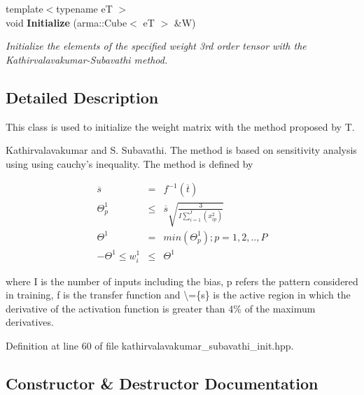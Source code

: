 \begin{DoxyCompactItemize}
{\footnotesize template$<$typename eT $>$ }\\void \textbf{ Initialize} (arma\+::\+Cube$<$ eT $>$ \&W)
\begin{DoxyCompactList}\small\item\em Initialize the elements of the specified weight 3rd order tensor with the Kathirvalavakumar-\/\+Subavathi method. \end{DoxyCompactList}\end{DoxyCompactItemize}


\subsection{Detailed Description}
This class is used to initialize the weight matrix with the method proposed by T. 

Kathirvalavakumar and S. Subavathi. The method is based on sensitivity analysis using using cauchy’s inequality. The method is defined by

\begin{eqnarray*} \overline{s} &=& f^{-1}(\overline{t}) \\ \Theta^{1}_{p} &\le& \overline{s} \sqrt{\frac{3}{I \sum_{i = 1}^{I} (x_{ip}^2)}} \\ \Theta^1 &=& min(\Theta_{p}^{1}); p=1,2,..,P \\ -\Theta^{1} \le w_{i}^{1} &\le& \Theta^{1} \end{eqnarray*}

where I is the number of inputs including the bias, p refers the pattern considered in training, f is the transfer function and \textbackslash{}=\{s\} is the active region in which the derivative of the activation function is greater than 4\% of the maximum derivatives. 

Definition at line 60 of file kathirvalavakumar\+\_\+subavathi\+\_\+init.\+hpp.



\subsection{Constructor \& Destructor Documentation}
\mbox{\label{classmlpack_1_1ann_1_1KathirvalavakumarSubavathiInitialization_aaf0e7a11a0a428552525a83382e45148}} 
